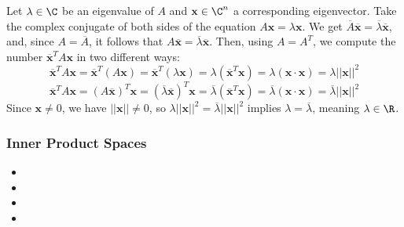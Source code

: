 {Let \(\lambda \in \C\) be an eigenvalue of \(A\) and \(\mathbf{x} \in \C^n\) a corresponding eigenvector. Take the complex conjugate of both sides of the equation \(A\mathbf{x} = \lambda\mathbf{x}\). We get \(\overline{A}\overline{\mathbf{x}} = \overline{\lambda}\overline{\mathbf{x}}\), and, since \(A = \overline{A}\), it follows that \(A\overline{\mathbf{x}} = \overline{\lambda}\overline{\mathbf{x}}\). Then, using \(A=A^T\), we compute the number \(\overline{\mathbf{x}}^TA\mathbf{x}\) in two different ways:
\begin{equation}
    \overline{\mathbf{x}}^TA\mathbf{x} = \overline{\mathbf{x}}^T(A\mathbf{x}) = \overline{\mathbf{x}}^T(\lambda\mathbf{x}) = \lambda(\overline{\mathbf{x}}^T\mathbf{x}) = \lambda(\mathbf{x} \cdot \mathbf{x}) = \lambda||\mathbf{x}||^2
\end{equation}
\begin{equation}
     \overline{\mathbf{x}}^TA\mathbf{x} = (A\overline{\mathbf{x}})^T\mathbf{x} = (\overline{\lambda}\overline{\mathbf{x}})^T\mathbf{x} = \overline{\lambda}(\overline{\mathbf{x}}^T\mathbf{x}) = \overline{\lambda}(\mathbf{x} \cdot \mathbf{x}) = \overline{\lambda}||\mathbf{x}||^2
\end{equation}
Since \(\mathbf{x} \neq 0\), we have \(||\mathbf{x}|| \neq 0\), so \(\lambda||\mathbf{x}||^2 = \overline{\lambda}||\mathbf{x}||^2\) implies \(\lambda = \overline{\lambda}\), meaning \(\lambda \in \R\).
}

\subsubsection{Inner Product Spaces}

\begin{itemize}
    \item {}
    \item {}
    \item {}
    \item {}
\end{itemize}

